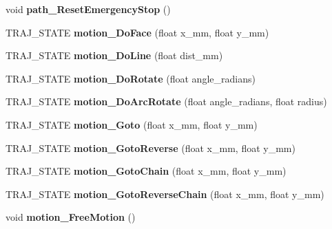 \begin{DoxyCompactItemize}
void {\bfseries path\+\_\+\+Reset\+Emergency\+Stop} ()
\item 
\mbox{\label{classAsservDriver_af7b023caadc3314c7640c98378829636}} 
T\+R\+A\+J\+\_\+\+S\+T\+A\+TE {\bfseries motion\+\_\+\+Do\+Face} (float x\+\_\+mm, float y\+\_\+mm)
\item 
\mbox{\label{classAsservDriver_a1b4a90efa1f4416161944d9b164be2bc}} 
T\+R\+A\+J\+\_\+\+S\+T\+A\+TE {\bfseries motion\+\_\+\+Do\+Line} (float dist\+\_\+mm)
\item 
\mbox{\label{classAsservDriver_aca1011c3fb10e594e836ea4ada6b92ff}} 
T\+R\+A\+J\+\_\+\+S\+T\+A\+TE {\bfseries motion\+\_\+\+Do\+Rotate} (float angle\+\_\+radians)
\item 
\mbox{\label{classAsservDriver_aabc36af66a38e2fb735e764730328994}} 
T\+R\+A\+J\+\_\+\+S\+T\+A\+TE {\bfseries motion\+\_\+\+Do\+Arc\+Rotate} (float angle\+\_\+radians, float radius)
\item 
\mbox{\label{classAsservDriver_a69d5e40538845c81b490a1ac3444847f}} 
T\+R\+A\+J\+\_\+\+S\+T\+A\+TE {\bfseries motion\+\_\+\+Goto} (float x\+\_\+mm, float y\+\_\+mm)
\item 
\mbox{\label{classAsservDriver_a96a9ab08074048b626f5f812c82c7342}} 
T\+R\+A\+J\+\_\+\+S\+T\+A\+TE {\bfseries motion\+\_\+\+Goto\+Reverse} (float x\+\_\+mm, float y\+\_\+mm)
\item 
\mbox{\label{classAsservDriver_a990f4ca32eef38a88031daa07fbe4546}} 
T\+R\+A\+J\+\_\+\+S\+T\+A\+TE {\bfseries motion\+\_\+\+Goto\+Chain} (float x\+\_\+mm, float y\+\_\+mm)
\item 
\mbox{\label{classAsservDriver_a724a7b68fdf74793ee2d159f82fe50e5}} 
T\+R\+A\+J\+\_\+\+S\+T\+A\+TE {\bfseries motion\+\_\+\+Goto\+Reverse\+Chain} (float x\+\_\+mm, float y\+\_\+mm)
\item 
\mbox{\label{classAsservDriver_aac603258c40d4c9aede0e5fce6ed4dea}} 
void {\bfseries motion\+\_\+\+Free\+Motion} ()
\item 
\mbox{\label{classAsservDriver_a0a68a702d1fea277c2e24e6dceb2d646}} 

\end{DoxyCompactItemize}
